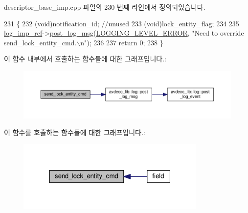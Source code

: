 descriptor\+\_\+base\+\_\+imp.\+cpp 파일의 230 번째 라인에서 정의되었습니다.


\begin{DoxyCode}
231 \{
232     (void)notification\_id; \textcolor{comment}{//unused}
233     (void)lock\_entity\_flag;
234 
235     \hyperlink{namespaceavdecc__lib_acbe3e2a96ae6524943ca532c87a28529}{log\_imp\_ref}->\hyperlink{classavdecc__lib_1_1log_a68139a6297697e4ccebf36ccfd02e44a}{post\_log\_msg}(\hyperlink{namespaceavdecc__lib_a501055c431e6872ef46f252ad13f85cdaf2c4481208273451a6f5c7bb9770ec8a}{LOGGING\_LEVEL\_ERROR}, \textcolor{stringliteral}{"Need to
       override send\_lock\_entity\_cmd.\(\backslash\)n"});
236 
237     \textcolor{keywordflow}{return} 0;
238 \}
\end{DoxyCode}


이 함수 내부에서 호출하는 함수들에 대한 그래프입니다.\+:
\nopagebreak
\begin{figure}[H]
\begin{center}
\leavevmode
\includegraphics[width=350pt]{classavdecc__lib_1_1descriptor__base__imp_a26fd66d8c409502eaa4dba47742ca7fa_cgraph}
\end{center}
\end{figure}




이 함수를 호출하는 함수들에 대한 그래프입니다.\+:
\nopagebreak
\begin{figure}[H]
\begin{center}
\leavevmode
\includegraphics[width=265pt]{classavdecc__lib_1_1descriptor__base__imp_a26fd66d8c409502eaa4dba47742ca7fa_icgraph}
\end{center}
\end{figure}


